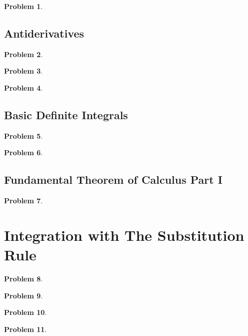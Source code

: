\documentclass{article}
\newtheorem{problem}{Problem}
\begin{document}
\begin{problem}

\end{problem}

\subsection{Antiderivatives}
\begin{problem}

\end{problem}
\begin{problem}

\end{problem}
\begin{problem}

\end{problem}

\subsection{Basic Definite Integrals}
\begin{problem}

\end{problem}

\begin{problem}

\end{problem}
\subsection{Fundamental Theorem of Calculus Part I}
\begin{problem}

\end{problem}

\section{Integration with The Substitution Rule}
\begin{problem}

\end{problem}

\begin{problem}

\end{problem}
\begin{problem}

\end{problem}
\begin{problem}

\end{problem}

\end{document}
